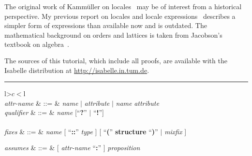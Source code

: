 \begin{isabellebody}
\begin{isamarkuptext}
  The original work of Kamm\"uller on locales~\cite{KammullerEtAl1999}
  may be of interest from a historical perspective.  My previous
  report on locales and locale expressions~\cite{Ballarin2004a}
  describes a simpler form of expressions than available now and is
  outdated. The mathematical background on orders and lattices is
  taken from Jacobson's textbook on algebra~\cite[Chapter~8]{Jacobson1985}.

  The sources of this tutorial, which include all proofs, are
  available with the Isabelle distribution at
  \url{http://isabelle.in.tum.de}.%
\end{isamarkuptext}%
\isamarkuptrue%
%
\begin{isamarkuptext}%
\begin{table}
\hrule
\vspace{2ex}
\begin{center}
\begin{tabular}{l>$c<$l}
   \\

  \textit{attr-name} & ::=
  & \textit{name} $|$ \textit{attribute} $|$
    \textit{name} \textit{attribute} \\
  \textit{qualifier} & ::=
  & \textit{name} [``\textbf{?}'' $|$ ``\textbf{!}''] \\[2ex]

   \\

  \textit{fixes} & ::=
  & \textit{name} [ ``\textbf{::}'' \textit{type} ]
    [ ``\textbf{(}'' \textbf{structure} ``\textbf{)}'' $|$
    \textit{mixfix} ] \\
\begin{comment}
  \textit{constrains} & ::=
  & \textit{name} ``\textbf{::}'' \textit{type} \\
\end{comment}
  \textit{assumes} & ::=
  & [ \textit{attr-name} ``\textbf{:}'' ] \textit{proposition} \\
\begin{comment}
  \textit{defines} & ::=
  & [ \textit{attr-name} ``\textbf{:}'' ] \textit{proposition} \\
  \textit{notes} & ::=
  & [ \textit{attr-name} ``\textbf{=}'' ]
    ( \textit{qualified-name} [ \textit{attribute} ] )$^+$ \\
\end{comment}


\end{tabular}
\end{center}
\end{table}
\end{isamarkuptext}
\end{isabellebody}
